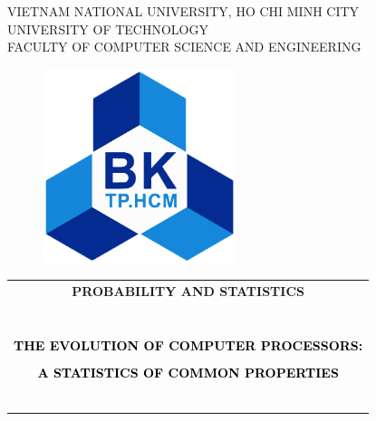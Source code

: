 \documentclass[a4paper]{report}
\author{}
\title{}
\date{}
\begin{document}
\begin{titlepage}
  \begin{center}
    VIETNAM NATIONAL UNIVERSITY, HO CHI MINH CITY\\
    UNIVERSITY OF TECHNOLOGY\\
    FACULTY OF COMPUTER SCIENCE AND ENGINEERING
  \end{center}

  \vspace{1cm}

  \begin{figure}[ht]
    \centering
    \includegraphics[width=0.5\textwidth]{hcmut.png}
  \end{figure}

  \vspace{1cm}

  \begin{center}
    \begin{tabular}{c}
      \multicolumn{1}{c}{\textbf{{\Large \color{blue} PROBABILITY AND STATISTICS}}} \\ \\
      ~~                                                                            \\
      \hline
      \\
      \textcolor{black}{\textbf{{\Large THE EVOLUTION OF COMPUTER PROCESSORS:}}}    \\\\
      \textcolor{black}{\textbf{{\Large A STATISTICS OF COMMON PROPERTIES}}}        \\
      ~~                                                                            \\
      \hline
      \\
    \end{tabular}
  \end{center}


\end{titlepage}
\end{document}
